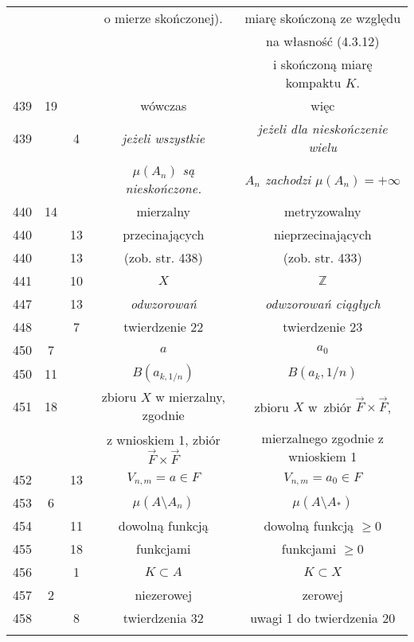 \documentclass[a4paper]{article}
\begin{document}
\begin{center}
\begin{tabular}{|c|c|c|c|c|}
    & & & o mierze skończonej). & miarę skończoną ze względu \\
    & & & & na własność (4.3.12) \\
    & & & & i skończoną miarę kompaktu $K$. \\
    439 & 19 & & wówczas & więc \\
    439 & & 4 & \emph{jeżeli wszystkie} & \emph{jeżeli dla
                                          nieskończenie wielu} \\
    & & & \emph{$\mu( A_{ n } )$ są nieskończone.}
           & \emph{$A_{ n }$ zachodzi $\mu( A_{ n } ) = +\infty$} \\
    440 & 14 & & mierzalny & metryzowalny \\
    440 & & 13 & przecinających & nieprzecinających \\
    440 & & 13 & (zob. str. 438) & (zob. str. 433) \\
    441 & & 10 & $X$ & $\mathbb{Z}$ \\
    447 & & 13 & \emph{odwzorowań} & \emph{odwzorowań ciągłych} \\
    448 & & 7 & twierdzenie 22 & twierdzenie 23 \\
    450 & 7 & & $a$ & $a_{ 0 }$ \\
    450 & 11 & & $B( a_{ k, 1/n } )$ & $B( a_{ k }, 1/n )$ \\
    451 & 18 & & zbioru $X$ w mierzalny, zgodnie
           & zbioru $X$ w~zbiór $\vec{ F } \times \vec{ F }$, \\
    & & & z wnioskiem 1, zbiór $\vec{ F } \times \vec{ F }$
           & mierzalnego zgodnie z wnioskiem 1 \\
    452 & & 13 & $V_{ n, m } = a \in F$ & $V_{ n, m } = a_{ 0 } \in F$ \\
    453 & 6 & & $\mu( A \setminus A_{ n } )$
           & $\mu( A \setminus A_{ * } )$ \\
    454 & & 11 & dowolną funkcją & dowolną funkcją $\geq 0$ \\
    455 & & 18 & funkcjami & funkcjami $\geq 0$ \\
    456 & & 1 & $K \subset A$ & $K \subset X$ \\
    457 & 2 & & niezerowej & zerowej \\
    458 & & 8 & twierdzenia 32 & uwagi 1 do twierdzenia 20 \\
    & & & & \\ \hline
  \end{tabular}


\end{center}
\end{document}
